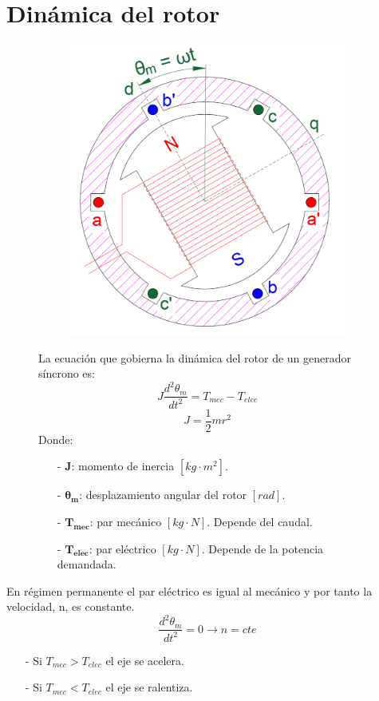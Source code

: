 \section{Dinámica del rotor}
\begin{figure}[H]
	\begin{minipage}{0.5\textwidth}
		\begin{figure}[H]
			\centering
			\includegraphics[width=0.7\linewidth]{res/tema6/ejes_dq}
			\label{fig:ejesdq}
		\end{figure}
	\end{minipage}
	\begin{minipage}{0.5\textwidth}
	La ecuación que gobierna la dinámica del rotor de un generador síncrono es:
	\[J\frac{d^2\theta_m}{dt^2}=T_{mec}-T_{elec}\]
	\[J=\frac{1}{2}mr^2\]
	Donde:
	\begin{itemize}
		\item [-] \textbf{J}: momento de inercia $\left[kg \cdot m^2\right]$.
		\item [-] \textbf{$\mathbf{\theta_m}$}: desplazamiento angular del rotor $[rad]$.
		\item [-] \textbf{$\mathbf{T_{mec}}$}: par mecánico $[kg \cdot N]$. Depende del caudal.
		\item [-] \textbf{$\mathbf{T_{elec}}$}: par eléctrico $[kg \cdot N]$. Depende de la potencia demandada.
	\end{itemize}
	\end{minipage}
\end{figure}
En régimen permanente el par eléctrico es igual al mecánico y por tanto la velocidad, n, es constante.
\[\frac{d^2\theta_m}{dt^2}=0 \rightarrow n=cte\]
\begin{itemize}
	\item [-] Si $T_{mec} > T_{elec}$ el eje se acelera.
	\item [-]  Si $T_{mec} < T_{elec}$ el eje se ralentiza.
\end{itemize}




